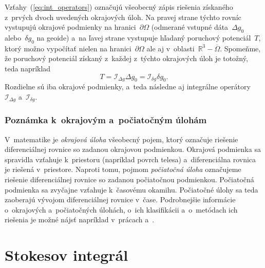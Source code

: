 \documentclass[a4paper, 12pt]{book}
\newcommand{\INT}{\mathcal I}
\begin{document}
Vzťahy~(\ref{eq:int_operators}) označujú všeobecný zápis riešenia získaného 
z~prvých dvoch uvedených okrajových úloh.  Na pravej strane týchto rovníc 
vystupujú okrajové podmienky na hranici~$\partial \Omega$ (odmerané vstupné 
dáta~$\Delta g_0$ alebo~$\delta g_0$ na geoide) a~na ľavej strane vystupuje 
hľadaný poruchový potenciál~$T$, ktorý možno vypočítať nielen na 
hranici~$\partial\Omega$ ale aj v~oblasti~$\mathbb{R}^3 - \overline\Omega$.  
Spomeňme, že poruchový potenciál získaný z~každej z~týchto okrajových úloh je 
totožný, teda napríklad
%
\begin{equation}
T = \INT_{\Delta g} \Delta g_0 = \INT_{\delta g}\delta g_0{.}
\end{equation}
%
Rozdielne sú iba okrajové podmienky, a~teda následne aj integrálne 
operátory~$\INT_{\Delta g}$ a~$\INT_{\delta g}$.


\subsubsection{Poznámka k~okrajovým a~počiatočným úlohám}

V~matematike je \emph{okrajová úloha} všeobecný pojem, ktorý označuje riešenie 
diferenciálnej rovnice so zadanou okrajovou podmienkou.  Okrajová podmienka sa 
spravidla vzťahuje k~priestoru (napríklad povrch telesa) a~diferenciálna 
rovnica je riešená v~priestore.  Naproti tomu, pojmom \emph{počiatočná úloha} 
označujeme riešenie diferenciálnej rovnice so zadanou počiatočnou podmienkou.  
Počiatočná podmienka sa zvyčajne vzťahuje k~časovému okamihu.  Počiatočné úlohy 
sa teda zaoberajú vývojom diferenciálnej rovnice v~čase.  Podrobnejšie 
informácie o~okrajových a~počiatočných úlohách, o~ich klasifikácii a~o~metódach 
ich riešenia je možné nájsť napríklad v~prácach \textcite{Janak2006} 
a~\textcite{Macak2021}.



\section{Stokesov integrál}
\label{sec:stokes_integral}
\end{document}
